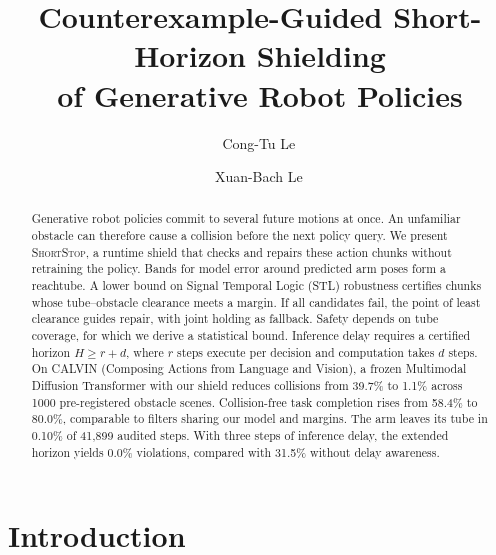 \documentclass[runningheads]{llncs}
\newcommand{\sys}{\textsc{ShortStop}}
\begin{document}
\title{Counterexample-Guided Short-Horizon Shielding\texorpdfstring{\\}{ }of Generative Robot Policies}

\author{Cong-Tu Le\, \and Xuan-Bach Le\,}

\maketitle

\begin{abstract}
Generative robot policies commit to several future motions at once. An
unfamiliar obstacle can therefore cause a collision before the next policy
query. We present \sys{}, a runtime shield that checks and repairs these
action chunks without retraining the policy. Bands for model error around predicted arm poses form a reachtube.
A lower bound on Signal Temporal Logic (STL) robustness certifies chunks
whose tube--obstacle clearance meets a margin. If all candidates fail,
the point of least clearance guides repair, with joint holding as fallback. Safety depends on tube coverage, for which we
derive a statistical bound. Inference delay requires a certified horizon
$H\ge r+d$, where $r$ steps execute per decision and computation takes
$d$ steps. On CALVIN
(Composing Actions from Language and Vision), a frozen Multimodal Diffusion
Transformer with our shield reduces collisions from 39.7\% to 1.1\% across
1000 pre-registered obstacle scenes. Collision-free task completion rises
from 58.4\% to 80.0\%, comparable to filters sharing our model and margins.
The arm leaves its tube in 0.10\% of 41{,}899 audited steps. With three
steps of inference delay, the extended horizon yields 0.0\% violations,
compared with 31.5\% without delay awareness.

\end{abstract}

\section{Introduction}
\end{document}
